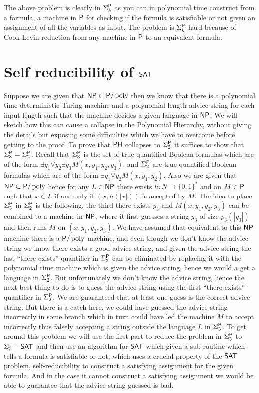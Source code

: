 \documentclass[11pt]{article}
\begin{document}
The above problem is clearly in $\Sigma_k^\P$ as you can in polynomial
time construct from a formula, a machine in $\P$ for checking if the
formula is satisfiable or not given an assignment of all the variables
as input. The problem is $\Sigma_k^\P$ hard because
of Cook-Levin reduction from any machine in $\P$ to an equivalent formula.
 
\section{Self reducibility of $\SAT$}

Suppose we are given that $\NP \subset \P/\poly$ then we know that
there is a polynomial time deterministic Turing machine and a
polynomial length advice string for each input length such that the
machine decides a given language in $\NP$. We will sketch how this can
cause a collapse in the Polynomial Hierarchy, without giving the
details but exposing some difficulties which we have to overcome
before getting to the proof. To prove that $\PH$ collapses to
$\Sigma_2^\P$ it suffices to show that $\Sigma_3^\P=\Sigma_2^\P$. Recall
that $\Sigma_3^\P$ is the set of true quantified Boolean formulas which
are of the form $\exists y_1 \forall y_2 \exists y_3
M(x,y_1,y_2,y_3)$, and $\Sigma_2^\P$ are true quantified Boolean
formulas which are of the form $\exists y_1 \forall y_2
M(x,y_1,y_2)$. Also we are given that $\NP \subset \P/\poly$ hence for
any $L\in \NP$ there exists $h:N \to \{0,1\}^*$ and an $M\in \P$ such
that $x \in L$ if and only if $(x,h(|x|))$ is accepted by $M$. The
idea to place $\Sigma_3^\P$ in $\Sigma_2^\P$ is the following, the third
there exists $y_3$ and $M(x,y_1,y_2,y_3)$ can be combined to a machine
in $\NP$, where it first guesses a string $y_3$ of size $p_3(|y_3|)$
and then runs $M$ on $(x,y_1,y_2,y_3)$. We have assumed that
equivalent to this $\NP$ machine there is a $\P/\poly$ machine, and
even though we don't know the advice string we know there exists a
good advice string, and given the advice string the last ``there
exists'' quantifier in $\Sigma_3^\P$ can be eliminated by replacing it
with the polynomial time machine which is given the advice string,
hence we would a get a language in $\Sigma_2^\P$. But unfortunately we
don't know the advice string, hence the next best thing to do is to
guess the advice string using the first ``there exists'' quantifier in
$\Sigma_2^\P$. We are guaranteed that at least one guess is the
correct advice string. But there is a catch here, we could have
guessed the advice string incorrectly in some branch which in turn
could have led the machine $M$ to accept incorrectly thus falsely
accepting a string outside the language $L$ in $\Sigma_3^\P$. To get
around this problem we will use the first part to reduce the problem
in $\Sigma_3^\P$ to $\Sigma_3-\SAT$ and then use an algorithm for
$\SAT$ which given a sub-routine which tells a formula is satisfiable
or not, which uses a crucial property of the $\SAT$ problem,
self-reducibility to construct a satisfying assignment for the given
formula. And in the case it cannot construct a satisfying assignment
we would be able to guarantee that the advice string guessed is bad.
\end{document}
